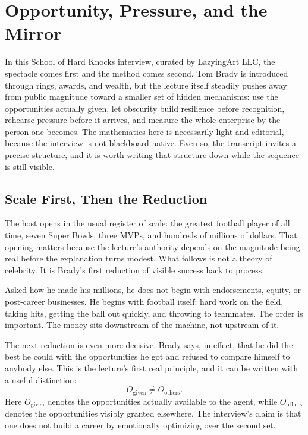 \chapter{Opportunity, Pressure, and the Mirror}

In this School of Hard Knocks interview, curated by LazyingArt LLC, the spectacle comes first and the method comes second. Tom Brady is introduced through rings, awards, and wealth, but the lecture itself steadily pushes away from public magnitude toward a smaller set of hidden mechanisms: use the opportunities actually given, let obscurity build resilience before recognition, rehearse pressure before it arrives, and measure the whole enterprise by the person one becomes. The mathematics here is necessarily light and editorial, because the interview is not blackboard-native. Even so, the transcript invites a precise structure, and it is worth writing that structure down while the sequence is still visible.

\section{Scale First, Then the Reduction}

The host opens in the usual register of scale: the greatest football player of all time, seven Super Bowls, three MVPs, and hundreds of millions of dollars. That opening matters because the lecture's authority depends on the magnitude being real before the explanation turns modest. What follows is not a theory of celebrity. It is Brady's first reduction of visible success back to process.

Asked how he made his millions, he does not begin with endorsements, equity, or post-career businesses. He begins with football itself: hard work on the field, taking hits, getting the ball out quickly, and throwing to teammates. The order is important. The money sits downstream of the machine, not upstream of it.

The next reduction is even more decisive. Brady says, in effect, that he did the best he could with the opportunities he got and refused to compare himself to anybody else. This is the lecture's first real principle, and it can be written with a useful distinction:
\begin{equation}
O_{\text{given}} \neq O_{\text{others}}.
\end{equation}
Here \(O_{\text{given}}\) denotes the opportunities actually available to the agent, while \(O_{\text{others}}\) denotes the opportunities visibly granted elsewhere. The interview's claim is that one does not build a career by emotionally optimizing over the second set.

